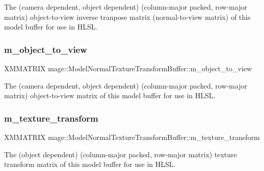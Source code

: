 The (camera dependent, object dependent) (column-\/major packed, row-\/major matrix) object-\/to-\/view inverse tranpose matrix (normal-\/to-\/view matrix) of this model buffer for use in H\+L\+SL. \hypertarget{structmage_1_1_model_normal_texture_transform_buffer_ad7529c313b070994419a129476db4308}{}\label{structmage_1_1_model_normal_texture_transform_buffer_ad7529c313b070994419a129476db4308} 
\subsubsection{\texorpdfstring{m\+\_\+object\+\_\+to\+\_\+view}{m\_object\_to\_view}}
{\footnotesize\ttfamily X\+M\+M\+A\+T\+R\+IX mage\+::\+Model\+Normal\+Texture\+Transform\+Buffer\+::m\+\_\+object\+\_\+to\+\_\+view}

The (camera dependent, object dependent) (column-\/major packed, row-\/major matrix) object-\/to-\/view matrix of this model buffer for use in H\+L\+SL. \hypertarget{structmage_1_1_model_normal_texture_transform_buffer_a702a55ad742e74f29c57582dd2686864}{}\label{structmage_1_1_model_normal_texture_transform_buffer_a702a55ad742e74f29c57582dd2686864} 
\subsubsection{\texorpdfstring{m\+\_\+texture\+\_\+transform}{m\_texture\_transform}}
{\footnotesize\ttfamily X\+M\+M\+A\+T\+R\+IX mage\+::\+Model\+Normal\+Texture\+Transform\+Buffer\+::m\+\_\+texture\+\_\+transform}

The (object dependent) (column-\/major packed, row-\/major matrix) texture transform matrix of this model buffer for use in H\+L\+SL. 